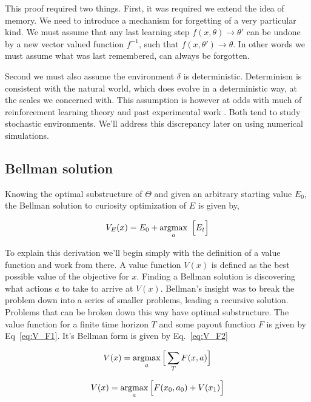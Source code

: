 This proof required two things. First, it was required we extend the idea of memory. We need to introduce a mechanism for forgetting of a very particular kind. We must assume that any last learning step $f(x, \theta) \rightarrow \theta'$ can be undone by a new vector valued function $f^{-1}$, such that $f(x, \theta') \rightarrow \theta$. In other words we must assume what was last remembered, can always be forgotten. 

Second we must also assume the environment $\delta$ is deterministic. Determinism is consistent with the natural world, which does evolve in a deterministic way, at the scales we concerned with. This assumption is however at odds with much of reinforcement learning theory \citep{needed} and past experimental work \citep{needed}. Both tend to study stochastic environments. We'll address this discrepancy later on using numerical simulations.

\subsection*{Bellman solution} Knowing the optimal substructure of $\Theta$ and given an arbitrary starting value $E_0$, the Bellman solution to curiosity optimization of $E$ is given by,

\begin{equation}
	\label{eq:V_E} 
	V_E(x) = E_0 + \operatorname*{argmax}_a \ \Big [ E_t \Big ] \\
\end{equation}

To explain this derivation we'll begin simply with the definition of a value function and work from there. A value function $V(x)$ is defined as the best possible value of the objective for $x$. Finding a Bellman solution is discovering what actions $a$ to take to arrive at $V(x)$. Bellman's insight was to break the problem down into a series of smaller problems, leading a recursive solution. Problems that can be broken down this way have optimal substructure. The value function for a finite time horizon $T$ and some payout function $F$ is given by Eq~\ref{eq:V_F1}. It's Bellman form is given by Eq.~\ref{eq:V_F2}

\begin{equation}
	\label{eq:V_F1}
	V(x) = \operatorname*{argmax}_a \Big [ \sum_T F(x, a) \Big ]
\end{equation}

\begin{equation}
	\label{eq:V_F2}
	V(x) = \operatorname*{argmax}_a \Big [ F(x_0, a_0) + V(x_1) \Big ]
\end{equation}

